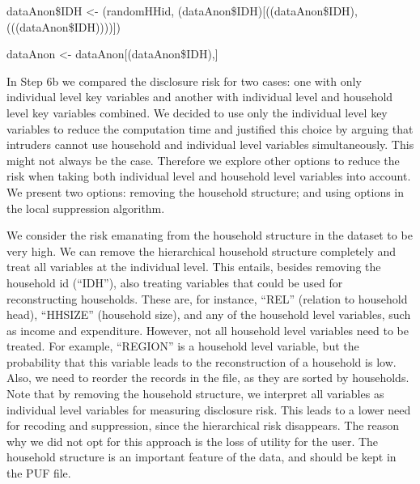 \documentclass[letterpaper,10pt,english]{sphinxmanual}
\begin{document}
\begin{DUlineblock}{0em}
\item[] dataAnon\$IDH \textless{}- (randomHHid,
(dataAnon\$IDH){[}((dataAnon\$IDH),
(((dataAnon\$IDH)))){]})
\item[] 
\item[] dataAnon \textless{}- dataAnon{[}(dataAnon\$IDH),{]}
\end{DUlineblock}


In Step 6b we compared the disclosure risk for two cases: one with only
individual level key variables and another with individual level and
household level key variables combined. We decided to use only the
individual level key variables to reduce the computation time and
justified this choice by arguing that intruders cannot use household and
individual level variables simultaneously. This might not always be the
case. Therefore we explore other options to reduce the risk when taking
both individual level and household level variables into account. We
present two options: removing the household structure; and using options
in the local suppression algorithm.


We consider the risk emanating from the household structure in the
dataset to be very high. We can remove the hierarchical household
structure completely and treat all variables at the individual level.
This entails, besides removing the household id (“IDH”), also treating
variables that could be used for reconstructing households. These are,
for instance, “REL” (relation to household head), “HHSIZE” (household
size), and any of the household level variables, such as income and
expenditure. However, not all household level variables need to be
treated. For example, “REGION” is a household level variable, but the
probability that this variable leads to the reconstruction of a
household is low. Also, we need to reorder the records in the file, as
they are sorted by households. Note that by removing the household
structure, we interpret all variables as individual level variables for
measuring disclosure risk. This leads to a lower need for recoding and
suppression, since the hierarchical risk disappears. The reason why we
did not opt for this approach is the loss of utility for the user. The
household structure is an important feature of the data, and should be
kept in the PUF file.
\end{document}

